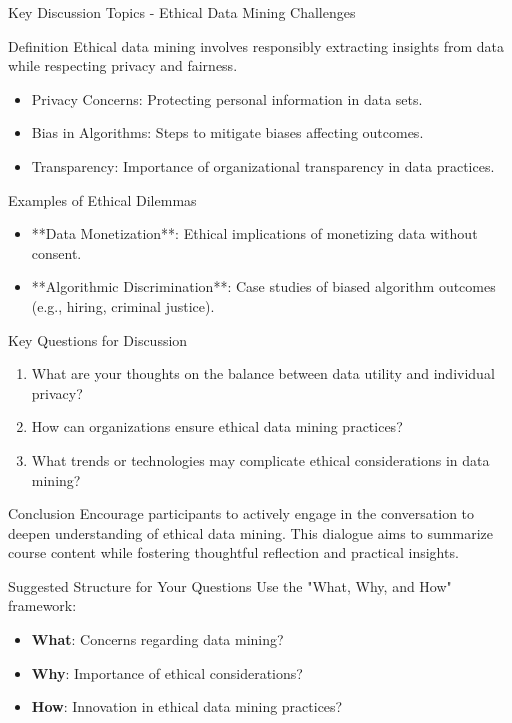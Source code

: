 \documentclass[aspectratio=169]{beamer}
\begin{document}
\begin{frame}[fragile]{Key Discussion Topics - Ethical Data Mining Challenges}
    \begin{block}{Definition}
        Ethical data mining involves responsibly extracting insights from data while respecting privacy and fairness.
    \end{block}
    \begin{itemize}
        \item Privacy Concerns: Protecting personal information in data sets.
        \item Bias in Algorithms: Steps to mitigate biases affecting outcomes.
        \item Transparency: Importance of organizational transparency in data practices.
    \end{itemize}
\end{frame}

\begin{frame}[fragile]{Examples of Ethical Dilemmas}
    \begin{itemize}
        \item **Data Monetization**: Ethical implications of monetizing data without consent.
        \item **Algorithmic Discrimination**: Case studies of biased algorithm outcomes (e.g., hiring, criminal justice).
    \end{itemize}
\end{frame}

\begin{frame}[fragile]{Key Questions for Discussion}
    \begin{enumerate}
        \item What are your thoughts on the balance between data utility and individual privacy?
        \item How can organizations ensure ethical data mining practices?
        \item What trends or technologies may complicate ethical considerations in data mining?
    \end{enumerate}
\end{frame}

\begin{frame}[fragile]{Conclusion}
    Encourage participants to actively engage in the conversation to deepen understanding of ethical data mining. This dialogue aims to summarize course content while fostering thoughtful reflection and practical insights.
    \begin{block}{Suggested Structure for Your Questions}
        Use the "What, Why, and How" framework:
        \begin{itemize}
            \item \textbf{What}: Concerns regarding data mining?
            \item \textbf{Why}: Importance of ethical considerations?
            \item \textbf{How}: Innovation in ethical data mining practices?
        \end{itemize}
    \end{block}
\end{frame}
\end{document}
